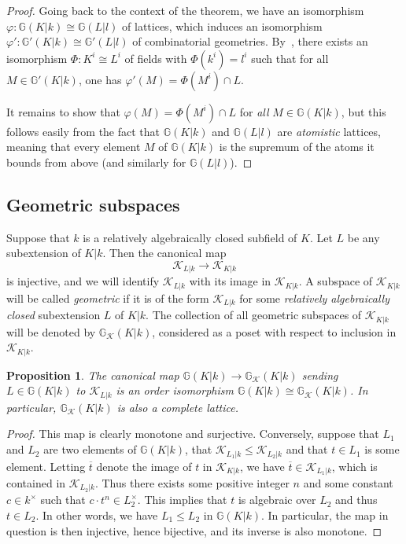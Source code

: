 \documentclass[12pt]{amsart}
\newcommand{\Gbb}{\mathbb{G}}
\newcommand{\Kcal}{\mathcal{K}}
\renewcommand{\bar}{\overline}
\renewcommand{\phi}{\varphi}
\newtheorem{proposition}[theorem]{Proposition}
\theoremstyle{definition}
\begin{document}
\begin{proof}
  Going back to the context of the theorem, we have an isomorphism $\phi : \Gbb(K|k) \cong \Gbb(L|l)$ of lattices, which induces an isomorphism $\phi' : \Gbb'(K|k) \cong \Gbb'(L|l)$ of combinatorial geometries.
  By~\cite[Theorem 4.2(ii)]{zbMATH05350217}, there exists an isomorphism $\Phi : K^{i} \cong L^{i}$ of fields with $\Phi(k^{i}) = l^{i}$ such that for all $M \in \Gbb'(K|k)$, one has $\phi'(M) = \Phi(M^{i}) \cap L$.

  It remains to show that $\phi(M) = \Phi(M^{i}) \cap L$ for \emph{all} $M \in \Gbb(K|k)$, but this follows easily from the fact that $\Gbb(K|k)$ and $\Gbb(L|l)$ are \emph{atomistic} lattices, meaning that every element $M$ of $\Gbb(K|k)$ is the supremum of the atoms it bounds from above (and similarly for $\Gbb(L|l)$).
\end{proof}

\subsection{Geometric subspaces}

Suppose that $k$ is a relatively algebraically closed subfield of $K$.
Let $L$ be any subextension of $K|k$.
Then the canonical map
\[ \Kcal_{L|k} \to \Kcal_{K|k} \]
is injective, and we will identify $\Kcal_{L|k}$ with its image in $\Kcal_{K|k}$.
A subspace of $\Kcal_{K|k}$ will be called \emph{geometric} if it is of the form $\Kcal_{L|k}$ for some \emph{relatively algebraically closed} subextension $L$ of $K|k$.
The collection of all geometric subspaces of $\Kcal_{K|k}$ will be denoted by $\Gbb_{\Kcal}(K|k)$, considered as a poset with respect to inclusion in $\Kcal_{K|k}$.

\begin{proposition}\label{proposition:geometric_lattice_iso}
  The canonical map $\Gbb(K|k) \to \Gbb_{\Kcal}(K|k)$ sending $L \in \Gbb(K|k)$ to $\Kcal_{L|k}$ is an order isomorphism $\Gbb(K|k) \cong \Gbb_{\Kcal}(K|k)$.
  In particular, $\Gbb_{\Kcal}(K|k)$ is also a complete lattice.
\end{proposition}
\begin{proof}
  This map is clearly monotone and surjective.
  Conversely, suppose that $L_{1}$ and $L_{2}$ are two elements of $\Gbb(K|k)$, that $\Kcal_{L_{1}|k} \le \Kcal_{L_{2}|k}$ and that $t \in L_{1}$ is some element.
  Letting $\bar t$ denote the image of $t$ in $\Kcal_{K|k}$, we have $\bar t \in \Kcal_{L_{1}|k}$, which is contained in $\Kcal_{L_{2}|k}$.
  Thus there exists some positive integer $n$ and some constant $c \in k^{\times}$ such that $c \cdot t^{n} \in L_{2}^{\times}$.
  This implies that $t$ is algebraic over $L_{2}$ and thus $t \in L_{2}$.
  In other words, we have $L_{1} \le L_{2}$ in $\Gbb(K|k)$.
  In particular, the map in question is then injective, hence bijective, and its inverse is also monotone.
\end{proof}
\end{document}
